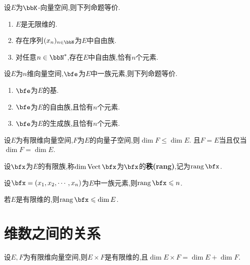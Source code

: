 \begin{prop}
    设$E$为$\bbK$-向量空间,则下列命题等价.

    \begin{enumerate}
        \item $E$是无限维的.
        \item 存在序列$(x_n)_{n \in \bbN}$为$E$中自由族.
        \item 对任意$n \in \bbN^*$,存在$E$中自由族,恰有$n$个元素.
    \end{enumerate}
\end{prop}

\begin{thm}
    设$E$为$n$维向量空间,$\bfe$为$E$中一族元素,则下列命题等价.

    \begin{enumerate}
        \item $\bfe$为$E$的基.
        \item $\bfe$为$E$的自由族,且恰有$n$个元素.
        \item $\bfe$为$E$的生成族,且恰有$n$个元素.
    \end{enumerate}
\end{thm}

\begin{thm}
    设$E$为有限维向量空间,$F$为$E$的向量子空间,则$\dim F \leqslant \dim E$.
    且$F = E$当且仅当$\dim F = \dim E$.
\end{thm}

\begin{deff}
    设$\bfx$为$E$的有限族,称$\dim \vect \bfx$为$\bfx$的\textbf{秩(rang)},记为$\rang \bfx$.
\end{deff}

\begin{prop}
    设$\bfx = (x_1, x_2, \cdots, x_n)$为$E$中一族元素,则$\rang \bfx \leqslant n$.
\end{prop}

\begin{prop}
    若$E$是有限维的,则$\rang \bfx \leqslant \dim E$.
\end{prop}

\section{维数之间的关系}

\begin{prop}
    设$E, F$为有限维向量空间,则$E \times F$是有限维的,且$\dim E \times F = \dim E + \dim F$.
\end{prop}


